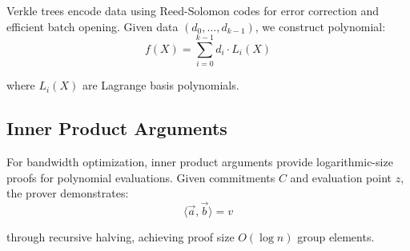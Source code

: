 Verkle trees encode data using Reed-Solomon codes for error correction and efficient batch opening. Given data $(d_0, \ldots, d_{k-1})$, we construct polynomial:
\begin{equation}
    f(X) = \sum_{i=0}^{k-1} d_i \cdot L_i(X)
\end{equation}

where $L_i(X)$ are Lagrange basis polynomials.

\subsection{Inner Product Arguments}

For bandwidth optimization, inner product arguments provide logarithmic-size proofs for polynomial evaluations. Given commitments $C$ and evaluation point $z$, the prover demonstrates:
\begin{equation}
    \langle \vec{a}, \vec{b} \rangle = v
\end{equation}

through recursive halving, achieving proof size $O(\log n)$ group elements.

